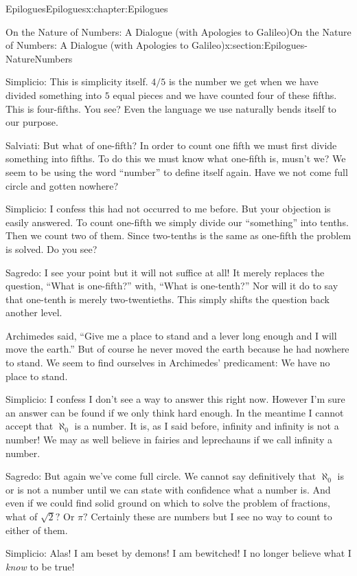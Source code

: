 \begin{chapterptx}{Epilogues}{}{Epilogues}{}{}{x:chapter:Epilogues}
\begin{sectionptx}{On the Nature of Numbers: A Dialogue (with Apologies to Galileo)}{}{On the Nature of Numbers: A Dialogue (with Apologies to Galileo)}{}{}{x:section:Epilogues-NatureNumbers}
\begin{introduction}{}
			\par
			\alert{Simplicio}:  This is simplicity itself. \(4/5\) is the number we get when we have divided something into \(5\) equal pieces and we have counted four of these fifths. This is four-fifths. You see? Even the language we use naturally bends itself to our purpose.%
			\par
			\alert{Salviati}:  But what of one-fifth? In order to count one fifth we must first divide something into fifths. To do this we must know what one-fifth is, musn't we? We seem to be using the word ``number'' to define itself again. Have we not come full circle and gotten nowhere?%
			\par
			\alert{Simplicio}:  I confess this had not occurred to me before. But your objection is easily answered. To count one-fifth we simply divide our ``something'' into tenths. Then we count two of them. Since two-tenths is the same as one-fifth the problem is solved. Do you see?%
			\par
			\alert{Sagredo}:  I see your point but it will not suffice at all! It merely replaces the question, ``What is one-fifth?'' with, ``What is one-tenth?'' Nor will it do to say that one-tenth is merely two-twentieths. This simply shifts the question back another level.%
			\par
			Archimedes said, ``Give me a place to stand and a lever long enough and I will move the earth.'' But of course he never moved the earth because he had nowhere to stand. We seem to find ourselves in Archimedes' predicament: We have no place to stand.%
			\par
			\alert{Simplicio}:  I confess I don't see a way to answer this right now. However I'm sure an answer can be found if we only think hard enough. In the meantime I cannot accept that \(\aleph_0\) is a number. It is, as I said before, infinity and infinity is not a number! We may as well believe in fairies and leprechauns if we call infinity a number.%
			\par
			\alert{Sagredo}:  But again we've come full circle. We cannot say definitively that \(\aleph_0\) is or is not a number until we can state with confidence what a number is. And even if we could find solid ground on which to solve the problem of fractions, what of \(\sqrt{2}?\) Or \(\pi?\) Certainly these are numbers but I see no way to count to either of them.%
			\par
			\alert{Simplicio}:  Alas! I am beset by demons! I am bewitched! I no longer believe what I \emph{know} to be true!%
			\par

\end{introduction}
\end{sectionptx}
\end{chapterptx}
